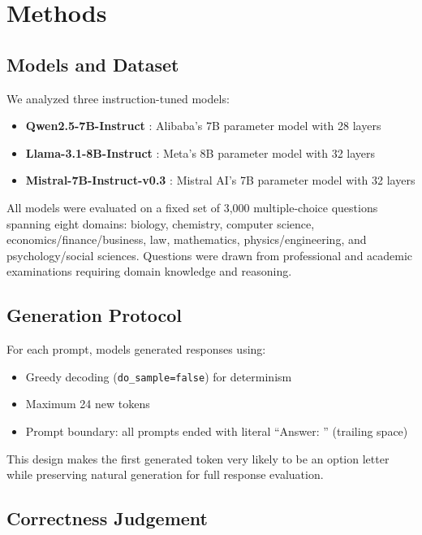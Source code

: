 \documentclass[11pt]{article}
\theoremstyle{definition}
\begin{document}
\section{Methods}

\subsection{Models and Dataset}

We analyzed three instruction-tuned models:

\begin{itemize}
    \item \textbf{Qwen2.5-7B-Instruct} \citep{qwen2025}: Alibaba's 7B parameter model with 28 layers
    \item \textbf{Llama-3.1-8B-Instruct} \citep{llama3.1}: Meta's 8B parameter model with 32 layers
    \item \textbf{Mistral-7B-Instruct-v0.3} \citep{mistral2024}: Mistral AI's 7B parameter model with 32 layers
\end{itemize}

All models were evaluated on a fixed set of 3,000 multiple-choice questions spanning eight domains: biology, chemistry, computer science, economics/finance/business, law, mathematics, physics/engineering, and psychology/social sciences. Questions were drawn from professional and academic examinations requiring domain knowledge and reasoning.

\subsection{Generation Protocol}

For each prompt, models generated responses using:
\begin{itemize}
    \item Greedy decoding (\texttt{do\_sample=false}) for determinism
    \item Maximum 24 new tokens
    \item Prompt boundary: all prompts ended with literal ``Answer: '' (trailing space)
\end{itemize}

This design makes the first generated token very likely to be an option letter while preserving natural generation for full response evaluation.

\subsection{Correctness Judgement}
\end{document}
